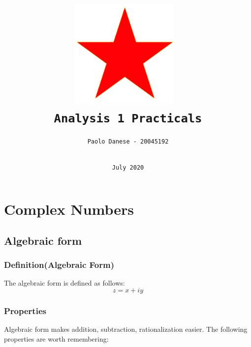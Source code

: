 \documentclass[a4paper]{report}
\begin{document}
\title{\includegraphics[width=0.4\textwidth]{seal.png}~\\[1cm]\textbf{\texttt{\textbf{Analysis 1 Practicals}}}}
\author{\texttt{Paolo Danese - 20045192}\\\\}
\date{\texttt{July 2020}}
\maketitle
\tableofcontents

\chapter{\textbf{Complex Numbers}}
\section{\textbf{Algebraic form}}
\subsection{\textbf{Definition(Algebraic Form)}}
The algebraic form is defined as follows:
\begin{equation}
z = x + iy
\end{equation}


\subsection{\textbf{Properties}}
Algebraic form makes addition, subtraction, rationalization easier.
The following properties are worth remembering:
\end{document}
